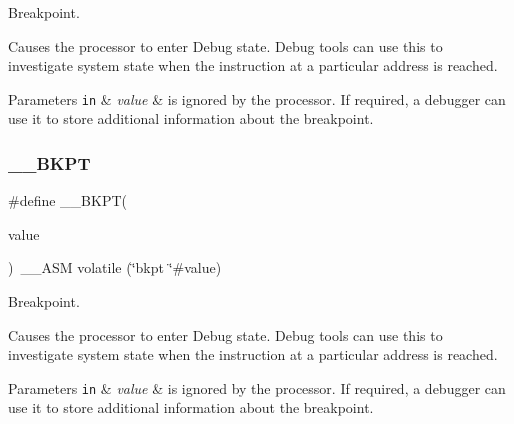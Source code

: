 Breakpoint. 

Causes the processor to enter Debug state. Debug tools can use this to investigate system state when the instruction at a particular address is reached. 
\begin{DoxyParams}[1]{Parameters}
\mbox{\tt in}  & {\em value} & is ignored by the processor. If required, a debugger can use it to store additional information about the breakpoint. \\
\hline
\end{DoxyParams}
\mbox{\label{group___c_m_s_i_s___core___instruction_interface_ga15ea6bd3c507d3e81c3b3a1258e46397}} 
\subsubsection{\texorpdfstring{\+\_\+\+\_\+\+B\+K\+PT}{\_\_BKPT}\hspace{0.1cm}{\footnotesize\ttfamily [3/3]}}
{\footnotesize\ttfamily \#define \+\_\+\+\_\+\+B\+K\+PT(\begin{DoxyParamCaption}\item[{}]{value }\end{DoxyParamCaption})~\+\_\+\+\_\+\+A\+SM volatile (\char`\"{}bkpt \char`\"{}\#value)}



Breakpoint. 

Causes the processor to enter Debug state. Debug tools can use this to investigate system state when the instruction at a particular address is reached. 
\begin{DoxyParams}[1]{Parameters}
\mbox{\tt in}  & {\em value} & is ignored by the processor. If required, a debugger can use it to store additional information about the breakpoint. \\
\hline
\end{DoxyParams}
\mbox{\label{group___c_m_s_i_s___core___instruction_interface_ga5d5bb1527e042be4a9fa5a33f65cc248}} 
